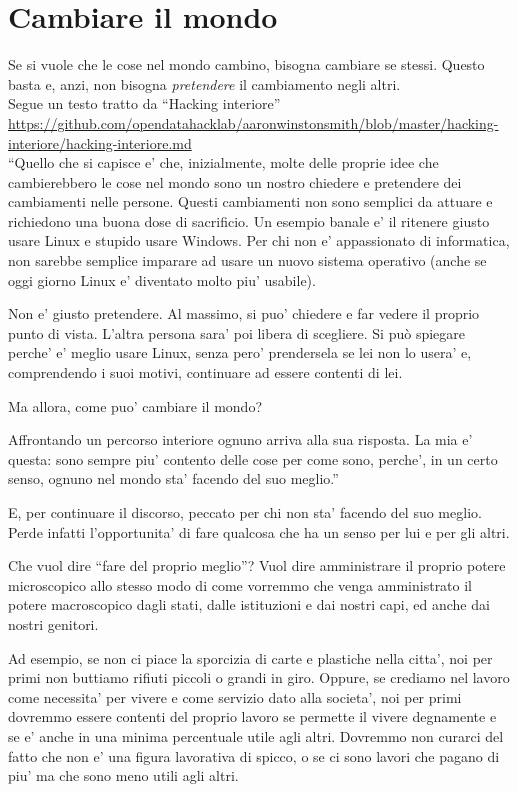 \chapter{Cambiare il mondo}

Se si vuole che le cose nel mondo cambino, bisogna cambiare se stessi. Questo basta e, anzi, non bisogna \emph{pretendere} il cambiamento negli altri.\\

Segue un testo tratto da ``Hacking interiore''\\
\url{https://github.com/opendatahacklab/aaronwinstonsmith/blob/master/hacking-interiore/hacking-interiore.md}\\

``Quello che si capisce e' che, inizialmente, molte delle proprie idee che cambierebbero le cose nel mondo sono un nostro chiedere e pretendere dei cambiamenti nelle persone. Questi cambiamenti non sono semplici da attuare e richiedono una buona dose di sacrificio. Un esempio banale e' il ritenere giusto usare Linux e stupido usare Windows. Per chi non e' appassionato di informatica, non sarebbe semplice imparare ad usare un nuovo sistema operativo (anche se oggi giorno Linux e' diventato molto piu' usabile).

Non e' giusto pretendere. Al massimo, si puo' chiedere e far vedere il proprio punto di vista. L'altra persona sara' poi libera di scegliere. Si può spiegare perche' e' meglio usare Linux, senza pero' prendersela se lei non lo usera' e, comprendendo i suoi motivi, continuare ad essere contenti di lei.

Ma allora, come puo' cambiare il mondo?

Affrontando un percorso interiore ognuno arriva alla sua risposta. La mia e' questa: sono sempre piu' contento delle cose per come sono, perche', in un certo senso, ognuno nel mondo sta' facendo del suo meglio.''

E, per continuare il discorso, peccato per chi non sta' facendo del suo meglio. Perde infatti l'opportunita' di fare qualcosa che ha un senso per lui e per gli altri. 

Che vuol dire ``fare del proprio meglio''? Vuol dire amministrare il proprio potere microscopico allo stesso modo di come vorremmo che venga amministrato il potere macroscopico dagli stati, dalle istituzioni e dai nostri capi, ed anche dai nostri genitori.

Ad esempio, se non ci piace la sporcizia di carte e plastiche nella citta', noi per primi non buttiamo rifiuti piccoli o grandi in giro. Oppure, se crediamo nel lavoro come necessita' per vivere e come servizio dato alla societa', noi per primi dovremmo essere contenti del proprio lavoro se permette il vivere degnamente e se e' anche in una minima percentuale utile agli altri. Dovremmo non curarci del fatto che non e' una figura lavorativa di spicco, o se ci sono lavori che pagano di piu' ma che sono meno utili agli altri.

